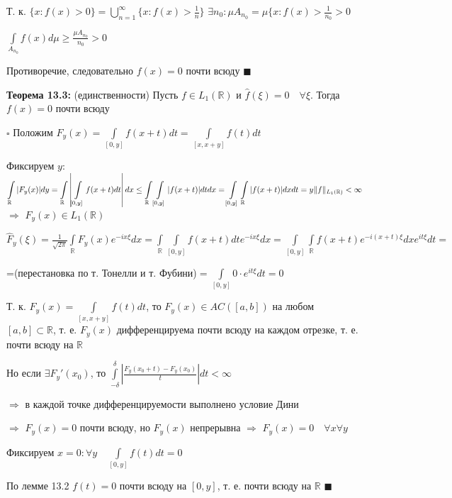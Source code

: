 \documentclass[a4paper]{report}
\newcommand*{\hm}[1]{#1\nobreak\discretionary{}%
            {\hbox{$\mathsurround=0pt #1$}}{}}
\begin{document}
Т. к. $\{x\colon f(x)>0\}=\bigcup\limits_{n=1}^\infty\{x\colon f(x)>\frac1n\}$ $\exists n_0\colon\mu A_{n_0}=\mu\{x\colon f(x)>\displaystyle\frac{1}{n_0}>0$

$\displaystyle\int\limits_{A_{n_0}}f(x)d\mu\ge\frac{\mu A_{n_0}}{n_0}>0$

Противоречие, следовательно $f(x)=0$ почти всюду $\blacksquare$
\bigskip

\noindent\textbf{Теорема 13.3:} (единственности) Пусть $f\in L_1(\mathbb R)$ и $\hat f(\xi)=0\quad\forall\xi$. Тогда $f(x)=0$ почти всюду

\noindent $\square$ Положим $F_y(x)=\displaystyle\int\limits_{[0,y]}f(x+t)dt=\displaystyle\int\limits_{[x,x+y]}f(t)dt$

Фиксируем $y$: $\displaystyle\int\limits_{\mathbb R}|F_y(x)|dy=\displaystyle\int\limits_{\mathbb R}\left|\displaystyle\int\limits_{[0,y]}f(x+t)dt\right|dx\le\displaystyle\int\limits_{\mathbb R}\displaystyle\int\limits_{[0,y]}|f(x+t)|dtdx\hm=\displaystyle\int\limits_{[0,y]}\displaystyle\int\limits_{\mathbb R}|f(x+t)|dxdt=y\|f\|_{L_1(\mathbb R)}<\infty$ $\Rightarrow$ $F_y(x)\in L_1(\mathbb R)$

$\hat F_y(\xi)=\displaystyle\frac{1}{\sqrt{2\pi}}\displaystyle\int\limits_{\mathbb R}F_y(x)e^{-ix\xi}dx=\displaystyle\int\limits_{\mathbb R}\displaystyle\int\limits_{[0,y]}f(x+t)dt e^{-ix\xi}dx=\displaystyle\int\limits_{[0,y]}\displaystyle\int\limits_{\mathbb R}f(x+t)e^{-i(x+t)\xi}dx e^{it\xi}dt=$

\noindent =(перестановка по т. Тонелли и т. Фубини)$=\displaystyle\int\limits_{[0,y]}0\cdot e^{it\xi}dt=0$

Т. к. $F_y(x)=\displaystyle\int\limits_{[x,x+y]}f(t)dt$, то $F_y(x)\in AC([a,b])$ на любом $[a,b]\subset \mathbb R$, т. е. $F_y(x)$ дифференцируема почти всюду на каждом отрезке, т. е. почти всюду на $\mathbb R$

Но если $\exists F_y'(x_0)$, то $\displaystyle\int\limits_{-\delta}^\delta\left|\frac{F_y(x_0+t)-F_y(x_0)}{t}\right|dt<\infty$

$\Rightarrow$ в каждой точке дифференцируемости выполнено условие Дини 

$\Rightarrow$ $F_y(x)=0$ почти всюду, но $F_y(x)$ непрерывна $\Rightarrow$ $F_y(x)=0\quad\forall x\forall y$

Фиксируем $x=0\colon\forall y\quad\displaystyle\int\limits_{[0,y]}f(t)dt=0$

По лемме 13.2 $f(t)=0$ почти всюду на $[0,y]$, т. е. почти всюду на $\mathbb R$ $\blacksquare$
\bigskip
\end{document}
